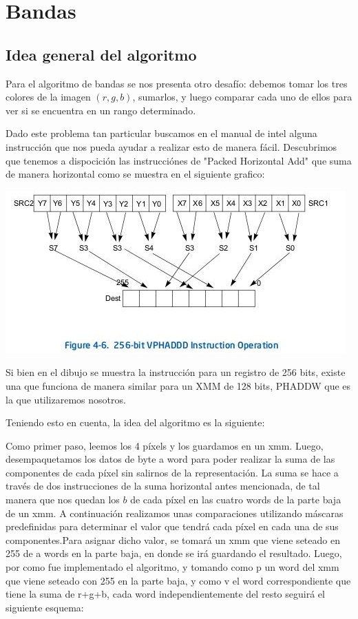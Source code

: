 \documentclass[a4paper]{article}
\begin{document}
\newpage
\section{Bandas}
\subsection{Idea general del algoritmo}
Para el algoritmo de bandas se nos presenta otro desafío: debemos tomar los tres colores de la imagen $(r,g,b)$, sumarlos, y luego comparar cada uno de ellos para ver si se encuentra en un rango determinado.

Dado este problema tan particular buscamos en el manual de intel alguna instrucción que nos pueda ayudar a realizar esto de manera fácil. Descubrimos que tenemos a dispocición las instrucciónes de "Packed Horizontal Add" que suma de manera horizontal como se muestra en el siguiente grafico:

\begin{center}
\includegraphics[scale=0.66]{Dibujos/SH.jpg}
\end{center}

Si bien en el dibujo se muestra la instrucción para un registro de 256 bits, existe una que funciona de manera similar para un XMM de 128 bits, PHADDW que es la que utilizaremos nosotros.

Teniendo esto en cuenta, la idea del algoritmo es la siguiente:

Como primer paso, leemos los 4 píxels y los guardamos en un xmm. Luego, desempaquetamos los datos de byte a word para poder realizar la suma de las componentes de cada píxel sin salirnos de la representación. La suma se hace a través de dos instrucciones de la suma horizontal antes mencionada, de tal manera que nos quedan los $b$ de cada píxel en las cuatro words de la parte baja de un xmm. A continuación realizamos unas comparaciones utilizando máscaras predefinidas para determinar el valor que tendrá cada píxel en cada una de sus componentes.Para asignar dicho valor, se tomará un xmm que viene seteado en 255 de a words en la parte baja, en donde se irá guardando el resultado. Luego, por como fue implementado el algoritmo, y tomando como p un word del xmm que viene seteado con 255 en la parte baja, y como v el word correspondiente que tiene la suma de r+g+b, cada word independientemente del resto seguirá el siguiente esquema:
\end{document}
